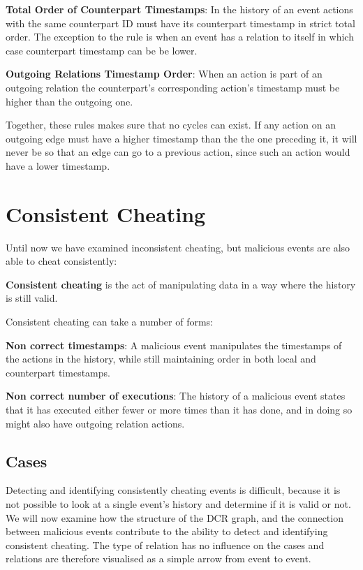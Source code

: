 	\newpar \textbf{Total Order of Counterpart Timestamps}: In the history of an event actions with the same counterpart ID must have its counterpart timestamp in strict total order.  The exception to the rule is when an event has a relation to itself in which case counterpart timestamp can be be lower. 
	
	\newpar \textbf{Outgoing Relations Timestamp Order}: When an action is part of an outgoing relation the counterpart's corresponding action's timestamp must be higher than the outgoing one.
	
	\newpar Together, these rules makes sure that no cycles can exist. If any action on an outgoing edge must have a higher timestamp than the the one preceding it, it will never be so that an edge can go to a previous action, since such an action would have a lower timestamp.
	
	\section{Consistent Cheating}
	Until now we have examined inconsistent cheating, but malicious events are also able to cheat consistently:
	\begin{definition}
		\textbf{Consistent cheating} is the act of manipulating data in a way where the history is still valid.
	\end{definition}
	
	\newpar Consistent cheating can take a number of forms:

	\newpar \textbf{Non correct timestamps}: A malicious event manipulates the timestamps of the actions in the history, while still maintaining order in both local and counterpart timestamps.
	
	\newpar \textbf{Non correct number of executions}: The history of a malicious event states that it has executed either fewer or more times than it has done, and in doing so might also have outgoing relation actions.
	
	\subsection{Cases}
	Detecting and identifying consistently cheating events is difficult, because it is not possible to look at a single event's history and determine if it is valid or not. We will now examine how the structure of the DCR graph, and the connection between malicious events contribute to the ability to detect and identifying consistent cheating. The type of relation has no influence on the cases and relations are therefore visualised as a simple arrow from event to event.
	
